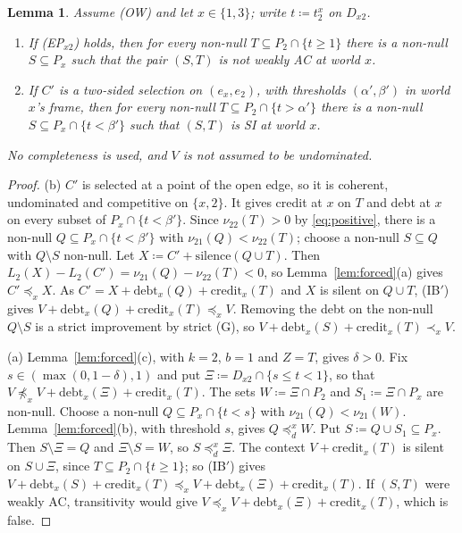 \documentclass[11pt]{article}
\newtheorem{lemma}[theorem]{Lemma}
\theoremstyle{definition}\newtheorem{definition}[theorem]{Definition}
\theoremstyle{remark}\newtheorem{remark}[theorem]{Remark}
\newcommand{\debt}{\mathrm{debt}}
\newcommand{\cred}{\mathrm{credit}}
\newcommand{\sil}{\mathrm{silence}}
\begin{document}
\begin{lemma}\label{lem:nwAC}
Assume (OW) and let $x\in\{1,3\}$; write $t\coloneqq t^x_2$ on $D_{x2}$.
\begin{enumerate}[label=(\alph*),leftmargin=*,itemsep=2pt]
\item If (EP$_{x2}$) holds, then for every non-null $T\subseteq
P_2\cap\{t\ge1\}$ there is a non-null $S\subseteq P_x$ such that the pair
$(S,T)$ is not weakly AC at world $x$.
\item If $C'$ is a two-sided selection on $(e_x,e_2)$, with thresholds
$(\alpha',\beta')$ in world $x$'s frame, then for every non-null
$T\subseteq P_2\cap\{t>\alpha'\}$ there is a non-null $S\subseteq
P_x\cap\{t<\beta'\}$ such that $(S,T)$ is SI at world $x$.
\end{enumerate}
No completeness is used, and $V$ is not assumed to be undominated.
\end{lemma}
\begin{proof}
(b) $C'$ is selected at a point of the open edge, so it is coherent,
undominated and competitive on $\{x,2\}$. It gives credit at $x$ on $T$ and
debt at $x$ on every subset of $P_x\cap\{t<\beta'\}$. Since
$\nu_{22}(T)>0$ by \eqref{eq:positive}, there is a non-null $Q\subseteq
P_x\cap\{t<\beta'\}$ with $\nu_{21}(Q)<\nu_{22}(T)$; choose a non-null
$S\subseteq Q$ with $Q\setminus S$ non-null. Let $X\coloneqq
C'+\sil(Q\cup T)$. Then $L_2(X)-L_2(C')=\nu_{21}(Q)-\nu_{22}(T)<0$, so
Lemma~\ref{lem:forced}(a) gives $C'\preceq_xX$. As
$C'=X+\debt_x(Q)+\cred_x(T)$ and $X$ is silent on $Q\cup T$, (IB$'$) gives
$V+\debt_x(Q)+\cred_x(T)\preceq_xV$. Removing the debt on the non-null
$Q\setminus S$ is a strict improvement by strict (G), so
$V+\debt_x(S)+\cred_x(T)\prec_xV$.

(a) Lemma~\ref{lem:forced}(c), with $k=2$, $b=1$ and $Z=T$, gives
$\delta>0$. Fix $s\in(\max(0,1-\delta),1)$ and put $\Xi\coloneqq
D_{x2}\cap\{s\le t<1\}$, so that
$V\not\preceq_xV+\debt_x(\Xi)+\cred_x(T)$. The sets $W\coloneqq\Xi\cap P_2$
and $S_1\coloneqq\Xi\cap P_x$ are non-null. Choose a non-null $Q\subseteq
P_x\cap\{t<s\}$ with $\nu_{21}(Q)<\nu_{21}(W)$. Lemma~\ref{lem:forced}(b),
with threshold $s$, gives $Q\preceq^x_dW$. Put $S\coloneqq Q\cup S_1\subseteq
P_x$. Then $S\setminus\Xi=Q$ and $\Xi\setminus S=W$, so $S\preceq^x_d\Xi$.
The context $V+\cred_x(T)$ is silent on $S\cup\Xi$, since $T\subseteq
P_2\cap\{t\ge1\}$; so (IB$'$) gives
$V+\debt_x(S)+\cred_x(T)\preceq_xV+\debt_x(\Xi)+\cred_x(T)$. If $(S,T)$ were
weakly AC, transitivity would give $V\preceq_xV+\debt_x(\Xi)+\cred_x(T)$,
which is false.
\end{proof}
\end{document}
